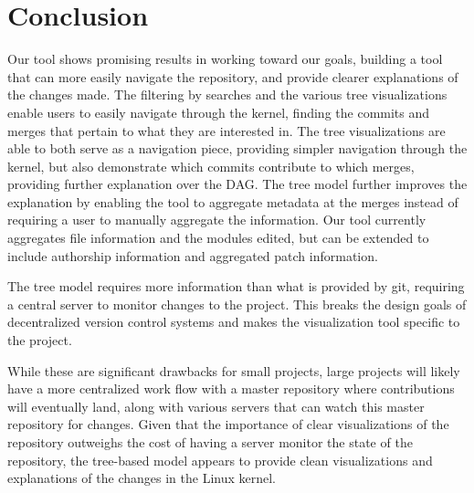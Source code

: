 \documentclass[conference, draftclsnofoot, draft]{IEEEtran}
\begin{document}
\section{Conclusion}

Our tool shows promising results in working toward our goals, building a tool that
can more easily navigate the repository, and provide clearer explanations of the
changes made. The filtering by searches and the various tree visualizations enable
users to easily navigate through the kernel, finding the commits and merges that
pertain to what they are interested in. The tree visualizations are able to both
serve as a navigation piece, providing simpler navigation through the kernel, but
also demonstrate which commits contribute to which merges, providing further
explanation over the DAG. The tree model further improves the explanation by enabling
the tool to aggregate metadata at the merges instead of requiring a user to manually
aggregate the information. Our tool currently aggregates file information and the
modules edited, but can be extended to include authorship information and aggregated
patch information.

The tree model requires more information than what is provided by git, requiring a
central server to monitor changes to the project. This breaks the design goals of
decentralized version control systems and makes the visualization tool specific to
the project.

While these are significant drawbacks for small projects, large projects will likely
have a more centralized work flow with a master repository where contributions will
eventually land, along with various servers that can watch this master repository
for changes. Given that the importance of clear visualizations of the repository
outweighs the cost of having a server monitor the state of the repository, the
tree-based model appears to provide clean visualizations and explanations of the
changes in the Linux kernel.

\nocite{*}



\end{document}
